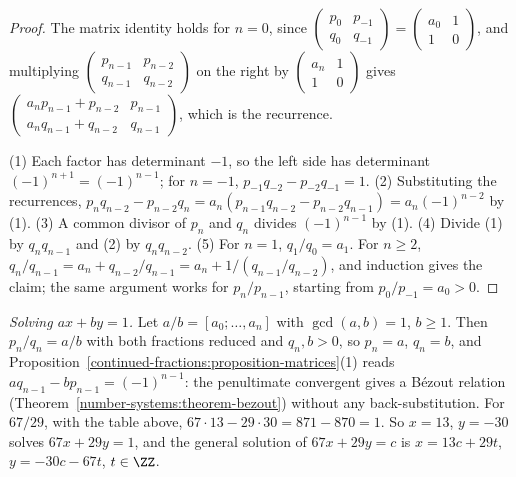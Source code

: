 \begin{proof}
The matrix identity holds for $n = 0$, since $\begin{pmatrix} p_0 & p_{-1}\\ q_0 & q_{-1}\end{pmatrix} = \begin{pmatrix} a_0 & 1\\ 1 & 0\end{pmatrix}$, and multiplying
$\begin{pmatrix} p_{n-1} & p_{n-2}\\ q_{n-1} & q_{n-2}\end{pmatrix}$ on the right by $\begin{pmatrix} a_n & 1\\ 1 & 0\end{pmatrix}$ gives
$\begin{pmatrix} a_np_{n-1} + p_{n-2} & p_{n-1}\\ a_nq_{n-1} + q_{n-2} & q_{n-1}\end{pmatrix}$, which is the recurrence.

(1) Each factor has determinant $-1$, so the left side has determinant $(-1)^{n+1} = (-1)^{n-1}$; for $n = -1$, $p_{-1}q_{-2} - p_{-2}q_{-1} = 1$. (2) Substituting the recurrences,
$p_nq_{n-2} - p_{n-2}q_n = a_n(p_{n-1}q_{n-2} - p_{n-2}q_{n-1}) = a_n(-1)^{n-2}$ by (1). (3) A common divisor of $p_n$ and $q_n$ divides $(-1)^{n-1}$ by (1). (4) Divide (1) by $q_nq_{n-1}$ and (2) by
$q_nq_{n-2}$. (5) For $n = 1$, $q_1/q_0 = a_1$. For $n \geq 2$, $q_n/q_{n-1} = a_n + q_{n-2}/q_{n-1} = a_n + 1/(q_{n-1}/q_{n-2})$, and induction gives the claim; the same argument works for
$p_n/p_{n-1}$, starting from $p_0/p_{-1} = a_0 > 0$.
\end{proof}

\begin{example}\label{continued-fractions:example-bezout}
\emph{Solving $ax + by = 1$.} Let $a/b = [a_0; \ldots, a_n]$ with $\gcd(a, b) = 1$, $b \geq 1$. Then $p_n/q_n = a/b$ with both fractions reduced and $q_n, b > 0$, so $p_n = a$, $q_n = b$, and
Proposition~\ref{continued-fractions:proposition-matrices}(1) reads $aq_{n-1} - bp_{n-1} = (-1)^{n-1}$: the penultimate convergent gives a Bézout relation
(Theorem~\ref{number-systems:theorem-bezout}) without any back-substitution. For $67/29$, with the table above, $67 \cdot 13 - 29 \cdot 30 = 871 - 870 = 1$. So $x = 13$, $y = -30$ solves
$67x + 29y = 1$, and the general solution of $67x + 29y = c$ is $x = 13c + 29t$, $y = -30c - 67t$, $t \in \ZZ$.
\end{example}

